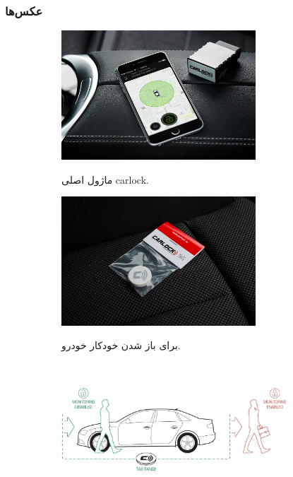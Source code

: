 \documentclass[a4paper,12pt]{report}
\begin{document}
	\subsubsection{
		عکس‌ها
	}\label{subsubsec2:subsec3:sec3:chap1}
	\begin{figure}[!h]
		\centering
		\footnotesize
		\begin{subfigure}[t]{0.3\linewidth}
			\centering
			\includegraphics[width=0.8\textwidth]{resources/carlock-main-module.jpg}
			\label{subfig1:fig1:subsec3:sec3:chap1}
			\caption{
				ماژول اصلی
				carlock.
			}
		\end{subfigure}
		\hspace*{1cm}
		\begin{subfigure}[t]{0.3\linewidth}
			\centering
			\includegraphics[width=0.8\textwidth]{resources/carlock-tag.jpg}
			\label{subfig2:fig1:subsec3:sec3:chap1}
			\caption{
			برای باز شدن خودکار خودرو.
			}
		\end{subfigure}\\
		\begin{subfigure}[t]{0.8\linewidth}
			\centering
			\includegraphics[width=0.93\textwidth]{resources/carlock-tag-functionality.jpg}

\end{subfigure}
\end{figure}
\end{document}
